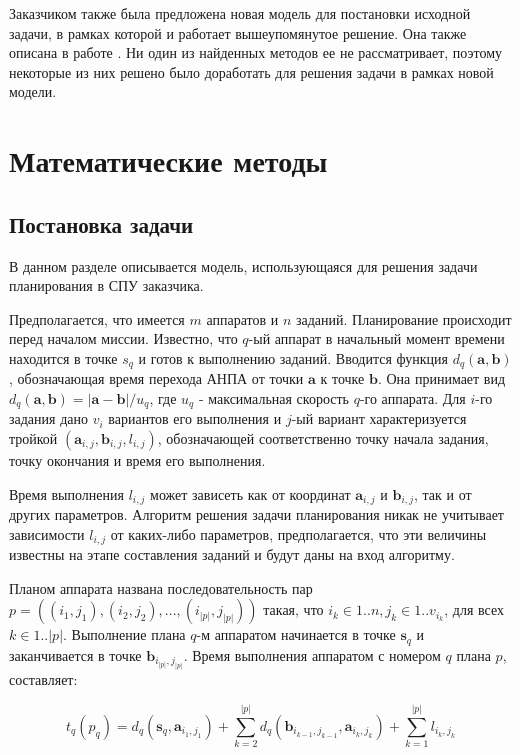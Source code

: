 \documentclass[a4paper,14pt,russian]{article}
\begin{document}
Заказчиком также была предложена новая модель для постановки исходной задачи, в рамках которой и работает вышеупомянутое решение. Она также описана в работе \cite{tuphanov1}. Ни один из найденных методов ее не рассматривает, поэтому некоторые из них решено было доработать для решения задачи в рамках новой модели.

\section{Математические методы}

\subsection{Постановка задачи}
В данном разделе описывается модель, использующаяся для решения задачи планирования в СПУ заказчика.

Предполагается, что имеется $m$ аппаратов и $n$ заданий. Планирование происходит перед началом миссии. Известно, что $q$-ый аппарат в начальный момент времени находится в точке $s_q$ и готов к выполнению заданий. Вводится функция $d_q(\mathbf{a}, \mathbf{b})$, обозначающая время перехода АНПА от точки $\mathbf{a}$ к точке $\mathbf{b}$. Она принимает вид $d_q(\mathbf{a}, \mathbf{b}) = |\mathbf{a} - \mathbf{b}| / u_q$, где $u_q$ - максимальная скорость $q$-го аппарата. Для $i$-го задания дано $v_i$ вариантов его выполнения и $j$-ый вариант характеризуется тройкой $(\mathbf{a}_{i, j}, \mathbf{b}_{i,j}, l_{i,j})$, обозначающей соответственно точку начала задания, точку окончания и время его выполнения.

Время выполнения $l_{i,j}$ может зависеть как от координат $\mathbf{a}_{i, j}$ и $\mathbf{b}_{i,j}$, так и от других параметров. Алгоритм решения задачи планирования никак не учитывает зависимости $l_{i,j}$ от каких-либо параметров, предполагается, что эти величины известны на этапе составления заданий и будут даны на вход алгоритму.

Планом аппарата названа последовательность пар $p = ((i_1, j_1), (i_2, j_2), ..., (i_{|p|}, j_{|p|}))$ такая, что $i_k \in 1..n, j_k \in 1..v_{i_k}$, для всех $k \in 1..|p|$. Выполнение плана $q$-м аппаратом начинается в точке $\mathbf{s}_q$ и заканчивается в точке $\mathbf{b}_{i_{|p|}, j_{|p|}}$. Время выполнения аппаратом с номером $q$ плана $p$, составляет:

\begin{equation} \label{varm1}
t_q(p_q) = d_q(\mathbf{s}_q, \mathbf{a}_{i_1, j_1}) + \sum_{k=2}^{|p|} d_q(\mathbf{b}_{i_{k-1}, j_{k - 1}}, \mathbf{a}_{i_k, j_k}) + \sum_{k=1}^{|p|}l_{i_k, j_k}
\end{equation}
\end{document}
